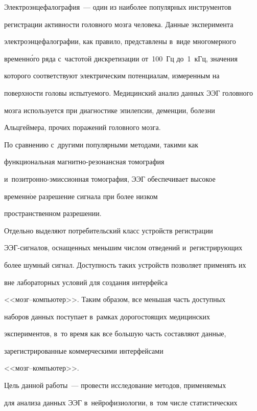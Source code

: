      

     Электроэнцефалография~--- один из наиболее популярных инструментов 

регистрации активности головного мозга человека. Данные эксперимента 

электроэнцефалографии, как правило, представлены в~виде многомерного 

временн\'{о}го ряда с~частотой дискретизации от~100~Гц до~1~кГц, значения 

которого соответствуют электрическим потенциалам, измеренным на 

поверхности головы испытуемого. Медицинский анализ данных ЭЭГ головного 

мозга используется при диагностике эпилепсии, деменции, болезни 

Альцгеймера, прочих поражений головного мозга.

     

     По сравнению с~другими популярными методами, такими как 

функциональная магнитно-резонансная томография  

и~по\-зит\-рон\-но-эмис\-си\-он\-ная томография, ЭЭГ обеспечивает высокое 

временн$\acute{\mbox{о}}$е разрешение сигнала при более низком 

пространственном разрешении.

     

     Отдельно выделяют потребительский класс устройств регистрации 

ЭЭГ-сиг\-на\-лов, оснащенных меньшим числом отведений и~регистрирующих 

более шумный сигнал. Доступность таких устройств позволяет применять их 

вне лабораторных условий для создания интерфейса  

<<мозг--ком\-пью\-тер>>. Таким образом, все меньшая часть доступных 

наборов данных поступает в~рамках дорогостоящих медицинских 

экспериментов, в~то время как все большую часть составляют данные, 

зарегистрированные коммерческими интерфейсами  

<<мозг--ком\-пью\-тер>>.

     

     Цель данной работы~--- провести исследование методов, применяемых 

для анализа данных ЭЭГ в~нейрофизиологии, в~том числе статистических 

